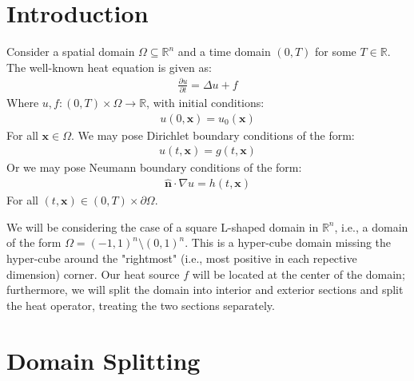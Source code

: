 \documentclass{article}
\newcommand{\bvec}[1]{\boldsymbol{#1}}
\newcommand{\brvec}[1]{\mathbf{#1}}
\begin{document}
\section{Introduction}

Consider a spatial domain $\Omega \subseteq \mathbb{R}^n$
and a time domain $(0, T)$ for some $T \in \mathbb{R}$.
The well-known heat equation is given as:
\begin{align*}
    \frac{\partial u}{\partial t} = \Delta u + f
\end{align*}
\noindent Where $u, f : (0, T) \times \Omega \rightarrow \mathbb{R}$,
with initial conditions:
\begin{align*}
    u(0, \bvec{x}) = u_0(\bvec{x})
\end{align*}
\noindent For all $\bvec{x} \in \Omega$.
We may pose Dirichlet boundary conditions of the form:
\begin{align*}
    u(t, \bvec{x}) = g(t, \bvec{x})
\end{align*}
\noindent Or we may pose Neumann boundary conditions of the form:
\begin{align*}
    \hat{\brvec{n}} \cdot \nabla u = h(t, \bvec{x})
\end{align*}
\noindent For all $(t, \bvec{x}) \in (0, T) \times \partial \Omega$.

We will be considering the case of a square L-shaped domain in $\mathbb{R}^n$,
i.e., a domain of the form $\Omega = (-1, 1)^n \setminus (0, 1)^n$.
This is a hyper-cube domain missing the hyper-cube around the "rightmost"
(i.e., most positive in each repective dimension) corner.
Our heat source $f$ will be located at the center of the domain;
furthermore, we will split the domain into interior and exterior sections
and split the heat operator, treating the two sections separately.

\newpage
\section{Domain Splitting}
\end{document}
